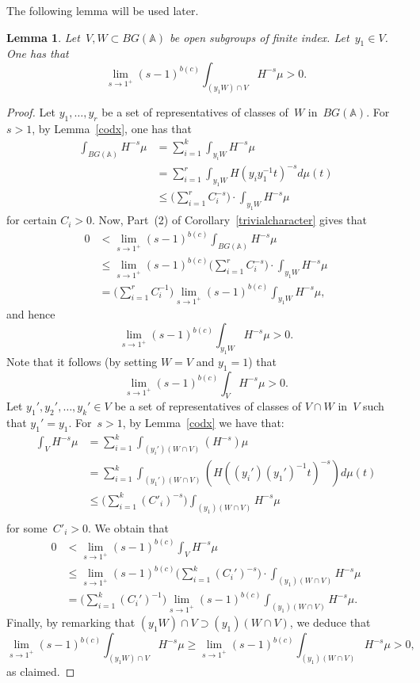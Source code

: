 \documentclass[a4paper,english,12pt]{amsart}
\newcommand{\doots}{,\dots ,}
\newcommand{\AAA}{\mathbb A}
\newtheorem{lem}[equation]{Lemma}
\numberwithin{equation}{subsection}
\begin{document}
The following lemma will be used later.
\begin{lem}\label{intfinind}
Let~$V, W\subset BG(\AAA)$ be open subgroups of finite index. Let~$y_1\in V$. One has that $$\lim_{s\to 1^+}(s-1)^{b(c)}\int_{(y_1W)\cap V}H^{-s}\mu>0.$$ 
\end{lem}
\begin{proof}
Let $y_1\doots y_r$ be a set of representatives of classes of~$W$ in~$BG(\AAA)$. For~$s>1$, by Lemma~\ref{codx}, one has that \begin{align*}\int_{BG(\AAA)}H^{-s}\mu&=\sum_{i=1}^k\int_{y_iW}H^{-s}\mu\\
&=\sum_{i=1}^r\int_{y_1W}H(y_iy_1^{-1}t)^{-s}d\mu(t)\\
&\leq\bigg( \sum_{i=1}^rC_i^{-s}\bigg)\cdot\int_{y_1W}H^{-s}\mu
\end{align*}
for certain $C_i>0$. Now, Part~(2) of Corollary~\ref{trivialcharacter} gives that
\begin{align*}
0&<\lim_{s\to 1^+}(s-1)^{b(c)}\int_{BG(\AAA)}H^{-s}\mu\\
&\leq\lim_{s\to 1^+}(s-1)^{b(c)}\bigg(\sum_{i=1}^rC_i^{-s}\bigg)\cdot\int_{y_1W}H^{-s}\mu\\
&=\bigg(\sum_{i=1}^rC_i^{-1}\bigg)\lim_{s\to 1^+}(s-1)^{b(c)}\int_{y_1W}H^{-s}\mu,
\end{align*}
and hence $$\lim_{s\to 1^+}(s-1)^{b(c)}\int_{y_1W}H^{-s}\mu>0.$$
Note that it follows (by setting $W=V$ and $y_1=1$) that $$\lim_{s\to 1^+}(s-1)^{b(c)}\int_{V}H^{-s}\mu>0.$$ %
Let $y_1', y_2'\doots y_k'\in V$ be a set of representatives of classes of $V\cap W$ in~$V$ such that $y_1'=y_1$. For~$s>1$, by Lemma~\ref{codx} we have that:
\begin{align*}
\int_{V}H^{-s}\mu&=\sum_{i=1}^k\int_{ (y_i')(W\cap V)}(H^{-s})\mu\\
&=\sum_{i=1}^k\int_{(y_1')(W\cap V)}(H((y_i')(y_1')^{-1}t)^{-s})d\mu(t)\\
&\leq \bigg(\sum_{i=1}^k(C'_i)^{-s}\bigg)\int_{(y_1)(W\cap V)}H^{-s}\mu\\
\end{align*}
for some~$C'_i>0$. We obtain that
\begin{align*}
0&<\lim_{s\to 1^+}(s-1)^{b(c)}\int_{V}H^{-s}\mu\\
&\leq\lim_{s\to 1^+}(s-1)^{b(c)}\bigg(\sum_{i=1}^k(C_i')^{-s}\bigg)\cdot\int_{(y_1)(W\cap V)}H^{-s}\mu\\
&=\bigg(\sum_{i=1}^k(C_i')^{-1}\bigg)\lim_{s\to 1^+}(s-1)^{b(c)}\int_{(y_1)(W\cap V)}H^{-s}\mu.
\end{align*}
Finally, by remarking that $(y_1W)\cap V\supset (y_1)(W\cap V)$, we deduce that $$\lim_{s\to 1^+}(s-1)^{b(c)}\int_{(y_1W)\cap V}H^{-s}\mu\geq \lim_{s\to 1^+}(s-1)^{b(c)}\int_{(y_1)(W\cap V)}H^{-s}\mu>0,$$as claimed.
\end{proof}
\end{document}
